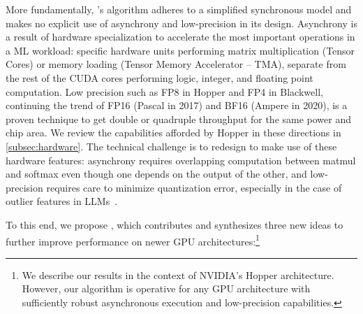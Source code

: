 More fundamentally, \faa's algorithm adheres to a simplified synchronous model and
makes no explicit use of asynchrony and low-precision in its design.
Asynchrony is a result of hardware specialization to accelerate the most important
operations in a ML workload: specific hardware
units performing matrix multiplication (Tensor Cores) or memory loading
(Tensor Memory Accelerator -- TMA), separate from the rest of the CUDA cores performing logic, integer, and floating
point computation.
Low precision such as FP8 in Hopper and FP4 in Blackwell, continuing the trend
of FP16 (Pascal in 2017) and BF16 (Ampere in 2020), is a proven technique to get
double or quadruple throughput for the same power and chip area.
We review the capabilities afforded by Hopper in these directions in \cref{subsec:hardware}.
The technical challenge is to redesign \faa to make use of these hardware
features: asynchrony requires overlapping computation between matmul and softmax
even though one depends on the output of the other, and low-precision requires
care to minimize quantization error, especially in the case of outlier features
in LLMs~\citep{dettmers2208llm, sun2024massive}.

To this end, we propose \fat, which contributes and synthesizes three new ideas to further improve performance on newer GPU architectures:\footnote{We describe our results in the context of NVIDIA's Hopper architecture.
However, our algorithm is operative for any GPU architecture with sufficiently robust asynchronous execution and low-precision capabilities.}

